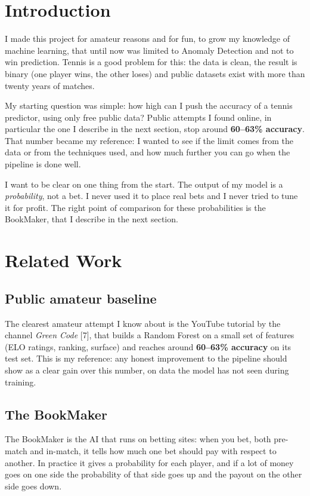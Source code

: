 \documentclass[10pt,twocolumn]{article}
\begin{document}
\section{Introduction}
I made this project for amateur reasons and for fun, to grow my knowledge of
machine learning, that until now was limited to Anomaly Detection and not to
win prediction. Tennis is a good problem for this: the data is clean, the
result is binary (one player wins, the other loses) and public datasets
exist with more than twenty years of matches.

My starting question was simple: how high can I push the accuracy of a
tennis predictor, using only free public data? Public attempts I found
online, in particular the one I describe in the next section, stop around
\textbf{60--63\% accuracy}. That number became my reference: I wanted to see
if the limit comes from the data or from the techniques used, and how much
further you can go when the pipeline is done well.

I want to be clear on one thing from the start. The output of my model is a
\emph{probability}, not a bet. I never used it to place real bets and I
never tried to tune it for profit. The right point of comparison for these
probabilities is the BookMaker, that I describe in the next section.

\section{Related Work}

\subsection{Public amateur baseline}
The clearest amateur attempt I know about is the YouTube tutorial by the
channel \textit{Green Code} [7], that builds a Random Forest on a small
set of features (ELO ratings, ranking, surface) and reaches around
\textbf{60--63\% accuracy} on its test set. This is my reference: any
honest improvement to the pipeline should show as a clear gain over this
number, on data the model has not seen during training.

\subsection{The BookMaker}
The BookMaker is the AI that runs on betting sites: when you bet, both
pre-match and in-match, it tells how much one bet should pay with respect
to another. In practice it gives a probability for each player, and if a
lot of money goes on one side the probability of that side goes up and the
payout on the other side goes down.
\end{document}
